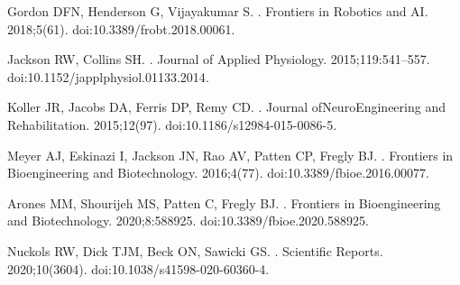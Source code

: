 \documentclass[10pt,letterpaper]{article}
\begin{document}
\begin{thebibliography}{10}
Gordon DFN, Henderson G, Vijayakumar S.
.
\newblock Frontiers in Robotics and AI. 2018;5(61).
\newblock doi:{10.3389/frobt.2018.00061}.

Jackson RW, Collins SH.
.
\newblock Journal of Applied Physiology. 2015;119:541--557.
\newblock doi:{10.1152/japplphysiol.01133.2014}.

Koller JR, Jacobs DA, Ferris DP, Remy CD.
.
\newblock Journal ofNeuroEngineering and Rehabilitation. 2015;12(97).
\newblock doi:{10.1186/s12984-015-0086-5}.

Meyer AJ, Eskinazi I, Jackson JN, Rao AV, Patten CP, Fregly BJ.
.
\newblock Frontiers in Bioengineering and Biotechnology. 2016;4(77).
\newblock doi:{10.3389/fbioe.2016.00077}.

Arones MM, Shourijeh MS, Patten C, Fregly BJ.
.
\newblock Frontiers in Bioengineering and Biotechnology. 2020;8:588925.
\newblock doi:{10.3389/fbioe.2020.588925}.

Nuckols RW, Dick TJM, Beck ON, Sawicki GS.
.
\newblock Scientific Reports. 2020;10(3604).
\newblock doi:{10.1038/s41598-020-60360-4}.

\end{thebibliography}
\end{document}
